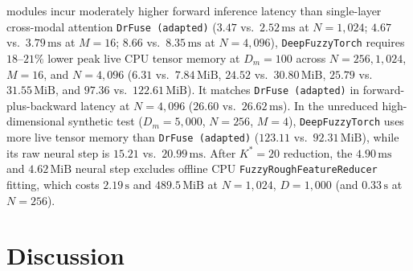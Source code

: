 \documentclass[10pt,twocolumn]{article}
\begin{document}
modules incur moderately higher forward inference latency than single-layer cross-modal
attention \texttt{DrFuse (adapted)} ($3.47$ vs.\ $2.52\,\text{ms}$ at $N=1,024$; $4.67$ vs.\
$3.79\,\text{ms}$ at $M=16$; $8.66$ vs.\ $8.35\,\text{ms}$ at $N=4,096$),
\texttt{DeepFuzzyTorch} requires $18\text{--}21\%$ lower peak live CPU tensor memory at
$D_m=100$ across $N=256, 1,024$, $M=16$, and $N=4,096$ ($6.31$ vs.\ $7.84\,\text{MiB}$,
$24.52$ vs.\ $30.80\,\text{MiB}$, $25.79$ vs.\ $31.55\,\text{MiB}$, and $97.36$ vs.\
$122.61\,\text{MiB}$). It matches \texttt{DrFuse (adapted)} in forward-plus-backward latency at
$N=4,096$ ($26.60$ vs.\ $26.62\,\text{ms}$). In the unreduced high-dimensional synthetic test
($D_m=5,000$, $N=256$, $M=4$), \texttt{DeepFuzzyTorch} uses more live tensor memory than
\texttt{DrFuse (adapted)} ($123.11$ vs.\ $92.31\,\text{MiB}$), while its raw neural step is
$15.21$ vs.\ $20.99\,\text{ms}$. After $K^*=20$ reduction, the $4.90\,\text{ms}$ and
$4.62\,\text{MiB}$ neural step excludes offline CPU \texttt{FuzzyRoughFeatureReducer} fitting,
which costs $2.19\,\text{s}$ and $489.5\,\text{MiB}$ at $N=1,024$, $D=1,000$ (and
$0.33\,\text{s}$ at $N=256$).

\FloatBarrier
\section{Discussion}
\label{sec:discussion}
\end{document}
